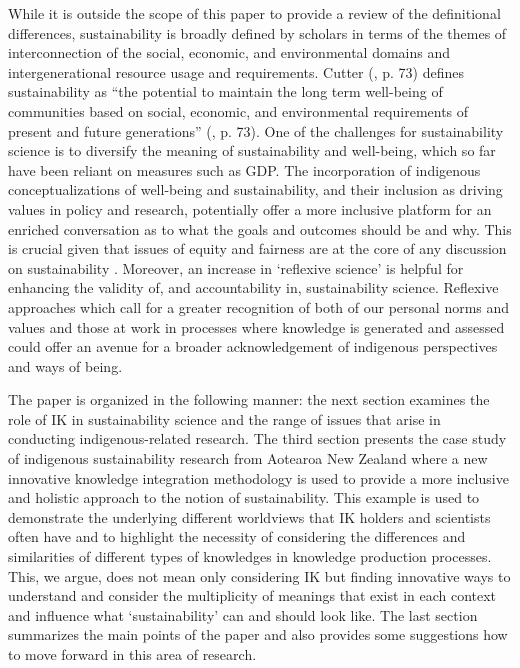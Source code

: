 \documentclass[10pt,a4paper]{article}
\begin{document}
\begin{multicols}{2}

While it is outside the scope of this paper to provide a review of the definitional differences, sustainability is broadly defined by scholars in terms of the themes of interconnection of the social, economic, and environmental domains and intergenerational resource usage and requirements. Cutter (\citep{r17}, p. 73) defines sustainability as ``the potential to maintain the long term well-being of communities based on social, economic, and environmental requirements of present and future generations'' (\citep{r17}, p. 73). One of the challenges for sustainability science is to diversify the meaning of sustainability and well-being, which so far have been reliant on measures such as GDP. The incorporation of indigenous conceptualizations of well-being and sustainability, and their inclusion as driving values in policy and research, potentially offer a more inclusive platform for an enriched conversation as to what the goals and outcomes should be and why. This is crucial given that issues of equity and fairness are at the core of any discussion on sustainability \citep{r18}. Moreover, an increase in `reflexive science' \citep{r19, r20} is helpful for enhancing the validity of, and accountability in, sustainability science. Reflexive approaches which call for a greater recognition of both of our personal norms and values and those at work in processes where knowledge is generated and assessed could offer an avenue for a broader acknowledgement of indigenous perspectives and ways of being.

The paper is organized in the following manner: the next section examines the role of IK in sustainability science and the range of issues that arise in conducting indigenous-related research. The third section presents the case study of indigenous sustainability research from Aotearoa New Zealand where a new innovative knowledge integration methodology is used to provide a more inclusive and holistic approach to the notion of sustainability. This example is used to demonstrate the underlying different worldviews that IK holders and scientists often have and to highlight the necessity of considering the differences and similarities of different types of knowledges in knowledge production processes. This, we argue, does not mean only considering IK but finding innovative ways to understand and consider the multiplicity of meanings that exist in each context and influence what `sustainability' can and should look like. The last section summarizes the main points of the paper and also provides some suggestions how to move forward in this area of research.




\end{multicols}
\end{document}

